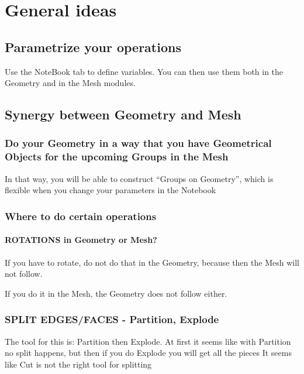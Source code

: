 \documentclass[10pt]{book}
\begin{document}
   \section{General ideas}
   
   
 \subsection{Parametrize your operations}

    Use the NoteBook tab to define variables. You can then use them both in the Geometry and in the Mesh modules.

 \subsection{Synergy between Geometry and Mesh}
 
 
 \subsubsection{Do your Geometry in a way that you have Geometrical Objects for the upcoming Groups in the Mesh}
 
  In that way, you will be able to construct ``Groups on Geometry'', which is flexible when you change your parameters in the Notebook
 
 \subsubsection{Where to do certain operations}
 
  \paragraph{ROTATIONS in Geometry or Mesh?}


If you have to rotate, do not do that in the Geometry, because then the Mesh will not follow.

If you do it in the Mesh, the Geometry does not follow either.

\subsubsection{SPLIT EDGES/FACES - Partition, Explode}


The tool for this is: Partition then Explode. At first it seems like with Partition no split happens, but then if you do Explode you will get all the pieces
It seems like Cut is not the right tool for splitting
\end{document}

